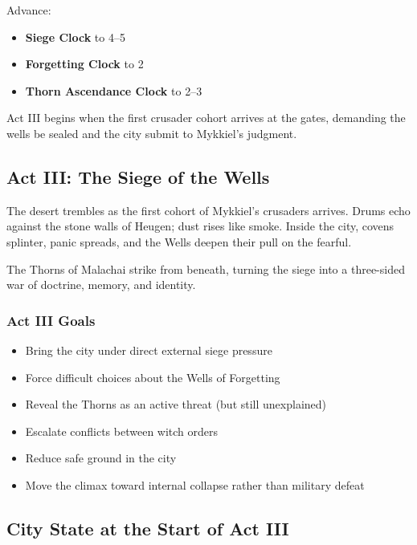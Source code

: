 \documentclass[11pt]{book}
\begin{document}
Advance:
\begin{itemize}
    \item \textbf{Siege Clock} to 4--5  
    \item \textbf{Forgetting Clock} to 2  
    \item \textbf{Thorn Ascendance Clock} to 2--3  
\end{itemize}

Act III begins when the first crusader cohort arrives at the gates,
demanding the wells be sealed and the city submit to Mykkiel's judgment.

\subsection{Act III: The Siege of the Wells}

The desert trembles as the first cohort of Mykkiel's crusaders arrives.
Drums echo against the stone walls of Heugen; dust rises like smoke.
Inside the city, covens splinter, panic spreads, and the Wells deepen
their pull on the fearful.

The Thorns of Malachai strike from beneath, turning the siege into
a three-sided war of doctrine, memory, and identity.

\subsubsection*{Act III Goals}
\begin{itemize}[leftmargin=*]
    \item Bring the city under direct external siege pressure
    \item Force difficult choices about the Wells of Forgetting
    \item Reveal the Thorns as an active threat (but still unexplained)
    \item Escalate conflicts between witch orders
    \item Reduce safe ground in the city
    \item Move the climax toward internal collapse rather than military defeat
\end{itemize}

\subsection*{City State at the Start of Act III}
\end{document}
